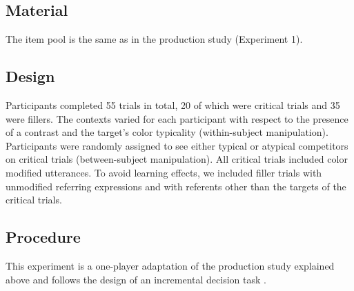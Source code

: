 \documentclass[10pt,letterpaper]{article}
\begin{document}


\subsection{Material}
The item pool is the same as in the production study (Experiment 1).


\subsection{Design}

Participants completed 55 trials in total, 20 of which were critical trials and 35 were fillers. The contexts varied for each participant with respect to the presence of a contrast and the target's color typicality (within-subject manipulation). Participants were randomly assigned to see either typical or atypical competitors on critical trials (between-subject manipulation). All critical trials included color modified utterances. 
To avoid learning effects, we included filler trials with unmodified referring expressions and with referents other than the targets of the critical trials. 



\subsection{Procedure}
This experiment is a one-player adaptation of the production study explained above and follows the design of an incremental decision task \cite{Qing:2018}. 
\end{document}
